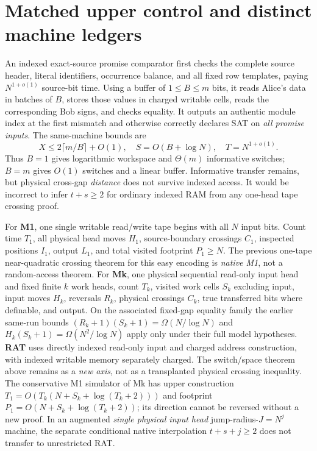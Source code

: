 \documentclass[11pt]{article}
\begin{document}
\section{Matched upper control and distinct machine ledgers}
An indexed exact-source promise comparator first checks the complete source header, literal identifiers, occurrence balance, and all fixed row templates, paying $N^{1+o(1)}$ source-bit time. Using a buffer of $1\le B\le m$ bits, it reads Alice's data in batches of $B$, stores those values in charged writable cells, reads the corresponding Bob signs, and checks equality. It outputs an authentic module index at the first mismatch and otherwise correctly declares SAT on \emph{all promise inputs}. The same-machine bounds are
\[
X\le2\lceil m/B\rceil+O(1),\quad
S=O(B+\log N),\quad
T=N^{1+o(1)}.\tag{7}
\]
Thus $B=1$ gives logarithmic workspace and $\Theta(m)$ informative switches; $B=m$ gives $O(1)$ switches and a linear buffer. Informative transfer remains, but physical cross-gap \emph{distance} does not survive indexed access. It would be incorrect to infer $t+s\ge2$ for ordinary indexed RAM from any one-head tape crossing proof.

For \textbf{M1}, one single writable read/write tape begins with all $N$ input bits. Count time $T_1$, all physical head moves $H_1$, source-boundary crossings $C_1$, inspected positions $I_1$, output $L_1$, and total visited footprint $P_1\ge N$. The previous one-tape near-quadratic crossing theorem for this easy encoding is \emph{native M1}, not a random-access theorem. For \textbf{Mk}, one physical sequential read-only input head and fixed finite $k$ work heads, count $T_k$, visited work cells $S_k$ excluding input, input moves $H_k$, reversals $R_k$, physical crossings $C_k$, true transferred bits where definable, and output. On the associated fixed-gap equality family the earlier same-run bounds $(R_k+1)(S_k+1)=\Omega(N/\log N)$ and $H_k(S_k+1)=\Omega(N^2/\log N)$ apply only under their full model hypotheses. \textbf{RAT} uses directly indexed read-only input and charged address construction, with indexed writable memory separately charged. The switch/space theorem above remains as a \emph{new axis}, not as a transplanted physical crossing inequality. The conservative M1 simulator of Mk has upper construction $T_1=O(T_k(N+S_k+\log(T_k+2)))$ and footprint $P_1=O(N+S_k+\log(T_k+2))$; its direction cannot be reversed without a new proof. In an augmented \emph{single physical input head} jump-radius-$J=N^j$ machine, the separate conditional native interpolation $t+s+j\ge2$ does not transfer to unrestricted RAT.
\end{document}
